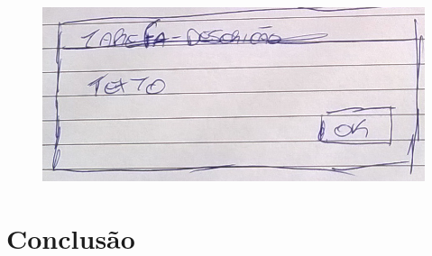 \documentclass[
	12pt,				%
	oneside,			%
	a4paper,			%
	english,			%
	french,				%
	spanish,			%
	brazil,				%
	]{abntex2}
\begin{document}
\begin{figure}[ht]
\centering
\includegraphics[width=1\textwidth]{imagens/proposta_tarefa_descricao.png}
\end{figure}

% 

\chapter*[Conclusão]{Conclusão}

\lipsum[31-33]

\postextual






\printindex
\end{document}
